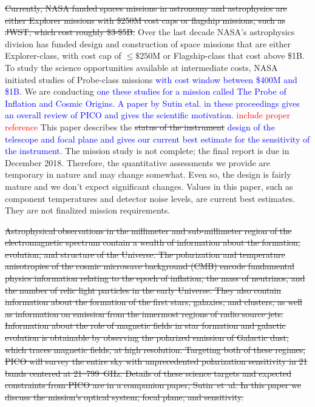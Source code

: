 \documentclass[]{spie}  %
\newcommand{\comr}[1]{\textcolor{red}{#1}}
\newcommand{\comb}[1]{\textcolor{blue}{#1}}
\begin{document}
\sout{Currently, NASA funded spaces missions in astronomy and astrophysics are either Explorer missions with \$250M cost caps or 
flagship missions, such as JWST, which cost roughly \$3-\$5B. }
Over the last decade NASA's astrophysics division has funded design and construction of space missions that are either Explorer-class, 
with cost cap of $\leq \$250$M or Flagship-class that cost above \$1B. 
To study the science opportunities available at intermediate costs, NASA initiated studies of Probe-class missions \comb{with cost window 
between \$400M and \$1B}.  We are conducting \comb{one these studies for a mission called The Probe of Inflation and Cosmic Origins. 
A paper by Sutin etal. in these proceedings gives an overall review of PICO and gives the scientific motivation. } 
\comr{include proper reference}
This paper describes the \sout{status of the instrument} \comb{design of the telescope and focal plane and gives 
our current best estimate for the sensitivity of the instrument.} The mission study is not complete; the final report 
is due in December 2018. Therefore, the quantitative assessments  we provide are temporary in nature and may change somewhat. 
Even so, the design is fairly mature and we don't expect significant changes. 
Values in this paper, such as component temperatures and detector noise levels,  
are current best estimates. They are not finalized mission requirements. 

\sout{Astrophysical observations in the  millimeter and sub-millimeter region of the electromagnetic spectrum contain a wealth of 
information about the formation, evolution, and structure of the Universe.  
The polarization and temperature anisotropies of the cosmic microwave 
background (CMB) encode fundamental physics information relating to the epoch of inflation, the mass of neutrinos,  
and the number of relic light particles in the early Universe. They also contain information about the formation of 
the first stars, galaxies, and clusters, as well as information on emission from the innermost regions of radio source jets.
Information about the role of magnetic fields in star formation and galactic evolution is obtainable 
by observing the polarized emission of Galactic dust, which 
traces magnetic fields, at high resolution. Targeting both of these regimes, PICO will survey the entire sky with 
unprecedented polarization sensitivity 
in 21 bands centered at 21--799~GHz.  Details of these science targets and expected constraints from PICO 
are in a companion paper, Sutin~et~al.\cite{brian_spie} 
In this paper we discuss the mission's optical system, focal plane, and sensitivity.}
\end{document}
